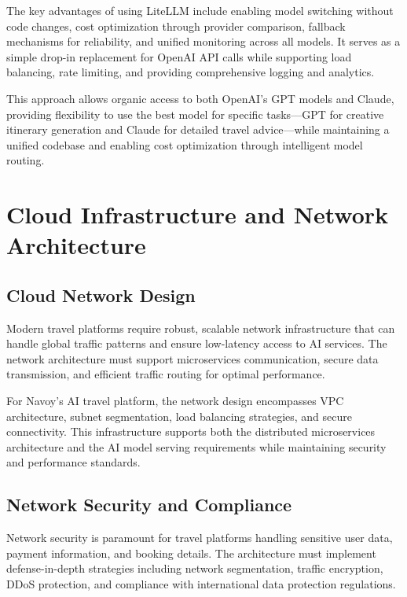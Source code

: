 The key advantages of using LiteLLM include enabling model switching without code changes, cost optimization through provider comparison, fallback mechanisms for reliability, and unified monitoring across all models. It serves as a simple drop-in replacement for OpenAI API calls while supporting load balancing, rate limiting, and providing comprehensive logging and analytics.

This approach allows organic access to both OpenAI's GPT models and Claude, providing flexibility to use the best model for specific tasks—GPT for creative itinerary generation and Claude for detailed travel advice—while maintaining a unified codebase and enabling cost optimization through intelligent model routing.

\section{Cloud Infrastructure and Network Architecture}

\subsection{Cloud Network Design}
Modern travel platforms require robust, scalable network infrastructure that can handle global traffic patterns and ensure low-latency access to AI services. The network architecture must support microservices communication, secure data transmission, and efficient traffic routing for optimal performance.

For Navoy's AI travel platform, the network design encompasses VPC architecture, subnet segmentation, load balancing strategies, and secure connectivity. This infrastructure supports both the distributed microservices architecture and the AI model serving requirements while maintaining security and performance standards.

\subsection{Network Security and Compliance}
Network security is paramount for travel platforms handling sensitive user data, payment information, and booking details. The architecture must implement defense-in-depth strategies including network segmentation, traffic encryption, DDoS protection, and compliance with international data protection regulations.

